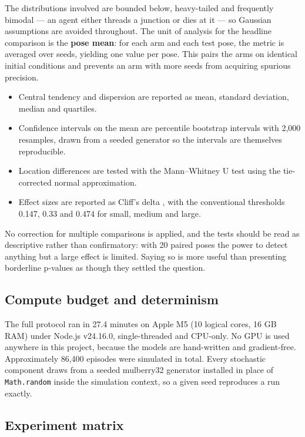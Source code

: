 \documentclass[conference]{IEEEtran}
\begin{document}
The distributions involved are bounded below, heavy-tailed and frequently bimodal — an agent either threads a junction or dies at it — so Gaussian assumptions are avoided throughout. The unit of analysis for the headline comparison is the \textbf{pose mean}: for each arm and each test pose, the metric is averaged over seeds, yielding one value per pose. This pairs the arms on identical initial conditions and prevents an arm with more seeds from acquiring spurious precision.

\begin{itemize}
\item Central tendency and dispersion are reported as mean, standard deviation, median and quartiles.
\item Confidence intervals on the mean are percentile bootstrap intervals \cite{efron} with 2,000 resamples, drawn from a seeded generator so the intervals are themselves reproducible.
\item Location differences are tested with the Mann–Whitney U test \cite{mannwhitney} using the tie-corrected normal approximation.
\item Effect sizes are reported as Cliff's delta \cite{cliff}, with the conventional thresholds 0.147, 0.33 and 0.474 for small, medium and large.
\end{itemize}

No correction for multiple comparisons is applied, and the tests should be read as descriptive rather than confirmatory: with 20 paired poses the power to detect anything but a large effect is limited. Saying so is more useful than presenting borderline p-values as though they settled the question.

\subsection{Compute budget and determinism}

The full protocol ran in 27.4 minutes on Apple M5 (10 logical cores, 16 GB RAM) under Node.js v24.16.0, single-threaded and CPU-only. No GPU is used anywhere in this project, because the models are hand-written and gradient-free. Approximately 86,400 episodes were simulated in total. Every stochastic component draws from a seeded mulberry32 generator installed in place of \texttt{Math.random} inside the simulation context, so a given seed reproduces a run exactly.

\subsection{Experiment matrix}
\end{document}
